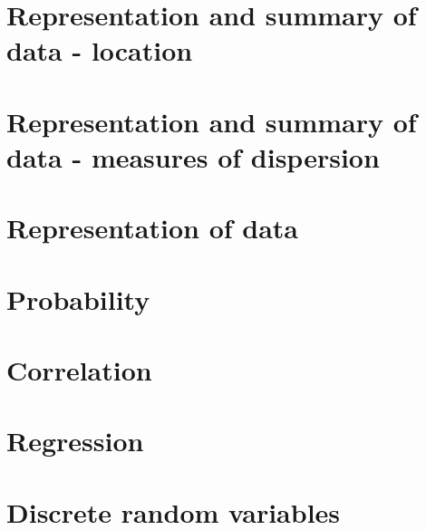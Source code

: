 \documentclass[a4paper]{article}
\begin{document}
\maketitle


\tableofcontents

\section{Representation and summary of data - location}
\begin{defi}

\end{defi}
\begin{defi}

\end{defi}
\begin{defi}

\end{defi}

\begin{defi}

\end{defi}
\section{Representation and summary of data - measures of dispersion}

\section{Representation of data}

\section{Probability}

\section{Correlation}

\section{Regression}

\section{Discrete random variables}
\end{document}
